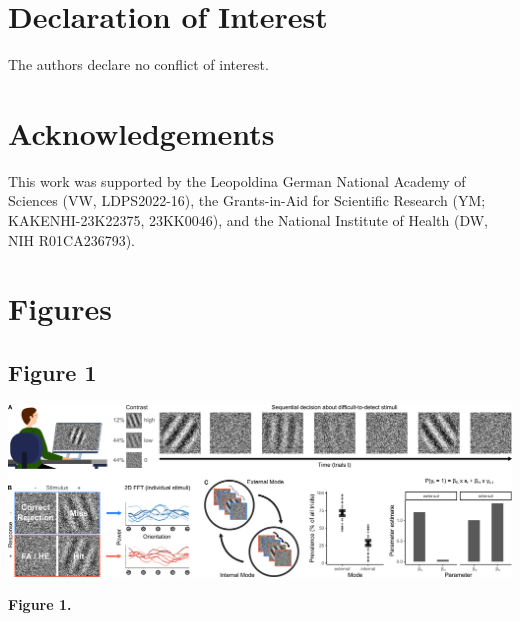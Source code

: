 \documentclass[
]{article}
\begin{document}
\newpage

\hypertarget{declaration-of-interest}{%
\section{Declaration of Interest}\label{declaration-of-interest}}

The authors declare no conflict of interest.

\hypertarget{acknowledgements}{%
\section{Acknowledgements}\label{acknowledgements}}

This work was supported by the Leopoldina German National Academy of
Sciences (VW, LDPS2022-16), the Grants-in-Aid for Scientific Research
(YM; KAKENHI-23K22375, 23KK0046), and the National Institute of Health
(DW, NIH R01CA236793).

\newpage

\hypertarget{figures}{%
\section{Figures}\label{figures}}

\hypertarget{figure-1}{%
\subsection{Figure 1}\label{figure-1}}

\includegraphics{./predictive_templates_files/figure-latex/Figure_1.png}

\textbf{Figure 1.}
\end{document}
